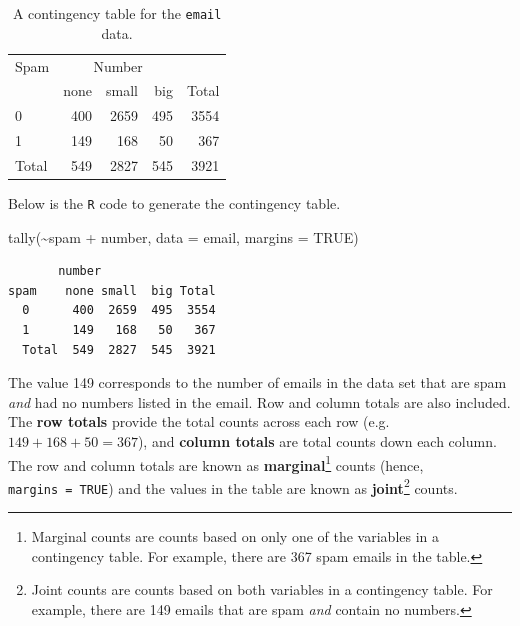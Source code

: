 \documentclass[
  letterpaper,
  DIV=11,
  numbers=noendperiod]{scrreprt}
\newenvironment{Shaded}{\begin{snugshade}}{\end{snugshade}}
\newcommand{\AttributeTok}[1]{\textcolor[rgb]{0.40,0.45,0.13}{#1}}
\newcommand{\ConstantTok}[1]{\textcolor[rgb]{0.56,0.35,0.01}{#1}}
\newcommand{\FunctionTok}[1]{\textcolor[rgb]{0.28,0.35,0.67}{#1}}
\newcommand{\NormalTok}[1]{\textcolor[rgb]{0.00,0.23,0.31}{#1}}
\newcommand{\SpecialCharTok}[1]{\textcolor[rgb]{0.37,0.37,0.37}{#1}}
\begin{document}
\begin{longtable}[t]{lrrrr}

\caption{\label{tbl-contin1}A contingency table for the \texttt{email}
data.}

\tabularnewline

\\
\toprule
\multicolumn{1}{c}{Spam} & \multicolumn{3}{c}{Number} & \multicolumn{1}{c}{ } \\
\cmidrule(l{3pt}r{3pt}){1-1} \cmidrule(l{3pt}r{3pt}){2-4}
 & none & small & big & Total\\
\midrule
0 & 400 & 2659 & 495 & 3554\\
1 & 149 & 168 & 50 & 367\\
Total & 549 & 2827 & 545 & 3921\\
\bottomrule

\end{longtable}

Below is the \texttt{R} code to generate the contingency table.

\begin{Shaded}
\begin{Highlighting}[]
\FunctionTok{tally}\NormalTok{(}\SpecialCharTok{\textasciitilde{}}\NormalTok{spam }\SpecialCharTok{+}\NormalTok{ number, }\AttributeTok{data =}\NormalTok{ email, }\AttributeTok{margins =} \ConstantTok{TRUE}\NormalTok{)}
\end{Highlighting}
\end{Shaded}

\begin{verbatim}
       number
spam    none small  big Total
  0      400  2659  495  3554
  1      149   168   50   367
  Total  549  2827  545  3921
\end{verbatim}

The value 149 corresponds to the number of emails in the data set that
are spam \emph{and} had no numbers listed in the email. Row and column
totals are also included. The \textbf{row totals} provide the total
counts across each row (e.g.~\(149 + 168 + 50 = 367\)), and
\textbf{column totals} are total counts down each column. The row and
column totals are known as \textbf{marginal}\footnote{Marginal counts
  are counts based on only one of the variables in a contingency table.
  For example, there are 367 spam emails in the table.} counts (hence,
\texttt{margins\ =\ TRUE}) and the values in the table are known as
\textbf{joint}\footnote{Joint counts are counts based on both variables
  in a contingency table. For example, there are 149 emails that are
  spam \emph{and} contain no numbers.} counts.
\end{document}
